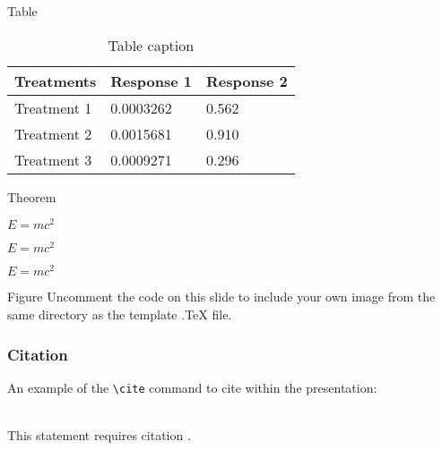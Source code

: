 \documentclass[aspectratio=169,xcolor=dvipsnames]{beamer}
\begin{document}
\begin{frame}{Table}
    \begin{table}
        \begin{tabular}{l l l}
            \toprule
            \textbf{Treatments} & \textbf{Response 1} & \textbf{Response 2} \\
            \midrule
            Treatment 1         & 0.0003262           & 0.562               \\
            Treatment 2         & 0.0015681           & 0.910               \\
            Treatment 3         & 0.0009271           & 0.296               \\
            \bottomrule
        \end{tabular}
        \caption{Table caption}
    \end{table}
\end{frame}


\begin{frame}{Theorem}
    \begin{theorem}
        $E = mc^2$
    \end{theorem}
\pause
	\begin{theorem}
		$E = mc^2$
	\end{theorem}
\pause
	\begin{theorem}
		$E = mc^2$
	\end{theorem}

\end{frame}


\begin{frame}{Figure}
    Uncomment the code on this slide to include your own image from the same directory as the template .TeX file.
\end{frame}


\begin{frame}[fragile] %
    \frametitle{Citation}
    An example of the \verb|\cite| command to cite within the presentation:\\~

    This statement requires citation \cite{p1}.
\end{frame}
\end{document}
